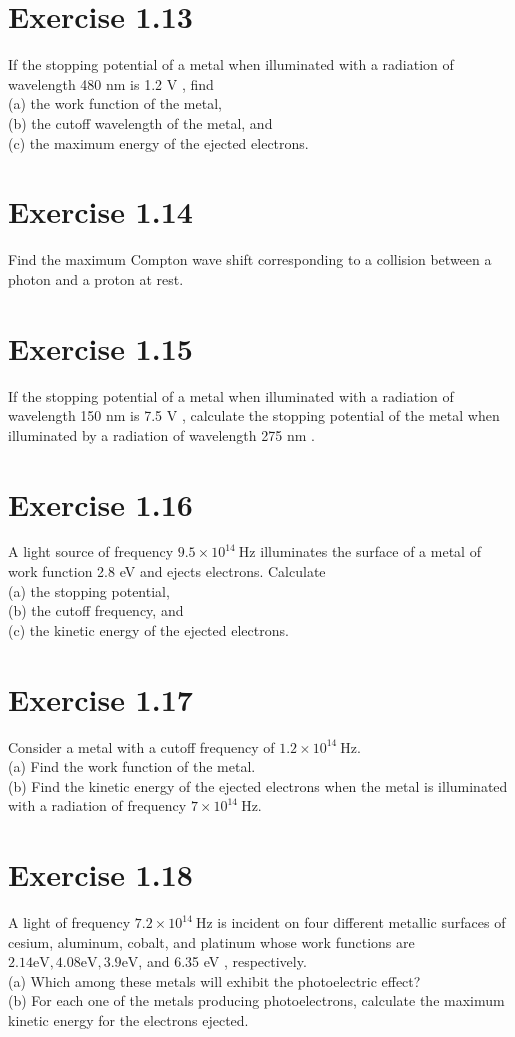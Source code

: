 \documentclass[10pt]{article}
\begin{document}
\section*{Exercise 1.13}
If the stopping potential of a metal when illuminated with a radiation of wavelength 480 nm is 1.2 V , find\\
(a) the work function of the metal,\\
(b) the cutoff wavelength of the metal, and\\
(c) the maximum energy of the ejected electrons.

\section*{Exercise 1.14}
Find the maximum Compton wave shift corresponding to a collision between a photon and a proton at rest.

\section*{Exercise 1.15}
If the stopping potential of a metal when illuminated with a radiation of wavelength 150 nm is 7.5 V , calculate the stopping potential of the metal when illuminated by a radiation of wavelength 275 nm .

\section*{Exercise 1.16}
A light source of frequency $9.5 \times 10^{14} \mathrm{~Hz}$ illuminates the surface of a metal of work function 2.8 eV and ejects electrons. Calculate\\
(a) the stopping potential,\\
(b) the cutoff frequency, and\\
(c) the kinetic energy of the ejected electrons.

\section*{Exercise 1.17}
Consider a metal with a cutoff frequency of $1.2 \times 10^{14} \mathrm{~Hz}$.\\
(a) Find the work function of the metal.\\
(b) Find the kinetic energy of the ejected electrons when the metal is illuminated with a radiation of frequency $7 \times 10^{14} \mathrm{~Hz}$.

\section*{Exercise 1.18}
A light of frequency $7.2 \times 10^{14} \mathrm{~Hz}$ is incident on four different metallic surfaces of cesium, aluminum, cobalt, and platinum whose work functions are $2.14 \mathrm{eV}, 4.08 \mathrm{eV}, 3.9 \mathrm{eV}$, and 6.35 eV , respectively.\\
(a) Which among these metals will exhibit the photoelectric effect?\\
(b) For each one of the metals producing photoelectrons, calculate the maximum kinetic energy for the electrons ejected.
\end{document}
